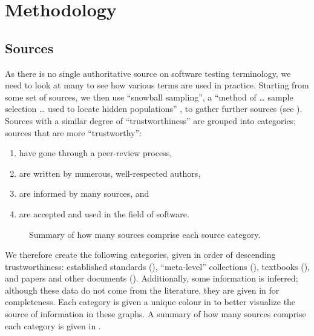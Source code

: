 \section{Methodology}
\label{methodology}

\subsection{Sources}
\label{sources}
As there is no single authoritative source on software testing terminology,
we need to look at many to see how various terms are used in practice.
Starting from some set of sources, we then use
``snowball sampling'', a ``method of \dots{} sample selection \dots{} used to
locate hidden populations'' \citep{Johnson2014}, to gather further sources
(see ). Sources with a similar degree of
``trustworthiness'' are grouped into categories; sources that are more
``trustworthy'':
\begin{enumerate}
    \item have gone through a peer-review process,
    \item are written by numerous, well-respected authors,
    \item are informed by many sources, and
    \item are accepted and used in the field of software.
\end{enumerate}

\ifnotpaper\else
    \begin{figure}
        \centering
        \caption{Summary of how many sources comprise each source category.}
        \label{fig:sourceSummary}
    \end{figure}
\fi

We therefore create the following categories, given in order of descending
trustworthiness: established standards (), ``meta-level''
collections (), textbooks (), and papers and other
documents (). \ifnotpaper
    Additionally, some information is inferred; although these data do not come
    from the literature, they are given in  for completeness.
\fi Each category is given a unique colour in  to better visualize the source of information in these
graphs. A summary of how many sources comprise each category is given in
.

